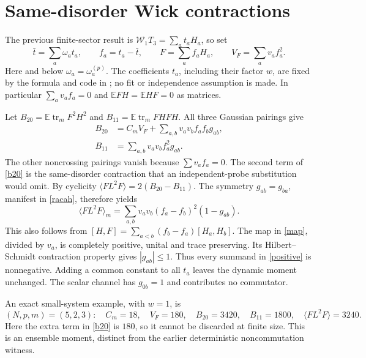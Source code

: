 \documentclass[11pt,a4paper]{article}
\newcommand{\tr}{\operatorname{tr}}
\newcommand{\E}{\mathbb E}
\newcommand{\W}{\mathcal W}
\newcommand{\av}[1]{\langle #1\rangle}
\begin{document}
\newpage
\section{Same-disorder Wick contractions}
The previous finite-sector result is
$\W_1T_3=\sum_a t_aH_a$, so set
\begin{equation}
 \bar t=\sum_a\omega_a t_a,\qquad f_a=t_a-\bar t,
 \qquad F=\sum_a f_aH_a,\qquad V_F=\sum_a v_af_a^2.
                                                               \label{filter}
\end{equation}
Here and below $\omega_a=\omega_a^{(p)}$. The coefficients $t_a$,
including their factor $w$, are fixed by the formula and code in
\cite{previous}; no fit or independence assumption is made.
In particular $\sum_a v_af_a=0$ and $\E FH=\E HF=0$ as matrices.

Let
$B_{20}=\E\tr_m F^2H^2$ and
$B_{11}=\E\tr_m FHFH$. All three Gaussian pairings give
\begin{align}
 B_{20}&=C_m V_F+\sum_{a,b}v_av_b f_af_b g_{ab},\label{b20}\\
 B_{11}&=\sum_{a,b}v_av_b f_a^2g_{ab}.         \label{b11}
\end{align}
The other noncrossing pairings vanish because $\sum v_af_a=0$.
The second term of \eqref{b20} is the same-disorder contraction
that an independent-probe substitution would omit.
By cyclicity $\av{FL^2F}=2(B_{20}-B_{11})$.
The symmetry $g_{ab}=g_{ba}$, manifest in \eqref{racah}, therefore yields
\begin{equation}
 \boxed{\av{FL^2F}_m
 =\sum_{a,b}v_av_b(f_a-f_b)^2(1-g_{ab}).}       \label{positive}
\end{equation}
This also follows from
$[H,F]=\sum_{a<b}(f_b-f_a)[H_a,H_b]$.
The map in \eqref{map}, divided by $v_a$, is completely positive,
unital and trace preserving. Its Hilbert--Schmidt contraction
property gives $|g_{ab}|\leq1$. Thus every summand in
\eqref{positive} is nonnegative. Adding a common constant to all
$t_a$ leaves the dynamic moment unchanged. The scalar channel has
$g_{0b}=1$ and contributes no commutator.

An exact small-system example, with $w=1$, is
\begin{equation}
 (N,p,m)=(5,2,3):\quad
 C_m=18,\quad V_F=180,\quad B_{20}=3420,\quad B_{11}=1800,
 \quad \av{FL^2F}=3240.                         \label{example}
\end{equation}
Here the extra term in \eqref{b20} is $180$, so it cannot be
discarded at finite size. This is an ensemble moment, distinct
from the earlier deterministic noncommutation witness.
\end{document}
